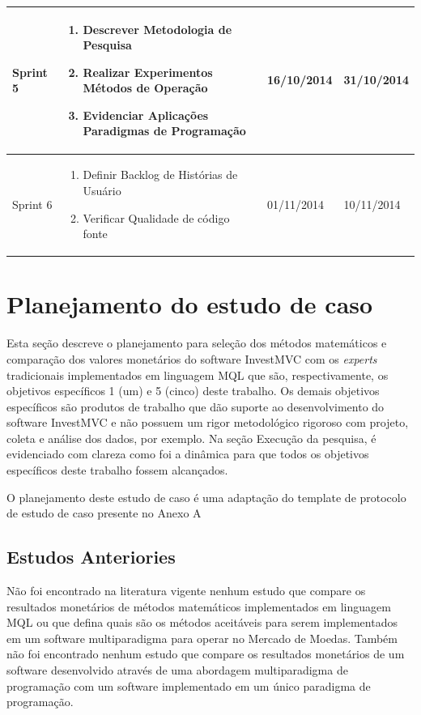 \begin{center}
\begin{longtable}{  | p{2cm} | p{8cm} | p{2cm}| p{2cm} |}
    Sprint 5 & \begin{enumerate}
    \item Descrever Metodologia de Pesquisa
    \item Realizar Experimentos Métodos de Operação
    \item Evidenciar Aplicações Paradigmas de Programação
    \end{enumerate} & 16/10/2014 & 31/10/2014\\ \hline
    
    Sprint 6 & \begin{enumerate}
    \item Definir Backlog de Histórias de Usuário
    \item Verificar Qualidade de código fonte
    \end{enumerate} & 01/11/2014 & 10/11/2014
\label{cronograma}
\end{longtable}
\end{center}

\section{Planejamento do estudo de caso}

Esta seção descreve o planejamento para seleção dos métodos matemáticos e comparação dos valores monetários do software InvestMVC com os \textit{experts} tradicionais implementados em linguagem MQL que são, respectivamente, os objetivos específicos 1 (um) e 5 (cinco) deste trabalho. Os demais objetivos específicos são produtos de trabalho que dão suporte ao desenvolvimento do software InvestMVC e não possuem um rigor metodológico rigoroso com projeto, coleta e análise dos dados, por exemplo. Na seção Execução da pesquisa, é evidenciado com clareza como foi a dinâmica para que todos os objetivos específicos deste trabalho fossem alcançados.

 O planejamento deste estudo de caso é uma adaptação do template de protocolo de estudo de caso presente no Anexo A \cite{brereton}

\subsection{Estudos Anteriories}
Não foi encontrado na literatura vigente nenhum estudo que compare os resultados monetários de métodos matemáticos implementados em linguagem MQL ou que defina quais são os métodos aceitáveis para serem implementados em um software multiparadigma para operar no Mercado de Moedas. Também não foi encontrado nenhum estudo que compare os resultados monetários de um software desenvolvido através de uma abordagem multiparadigma de programação com um software implementado em um único paradigma de programação.

